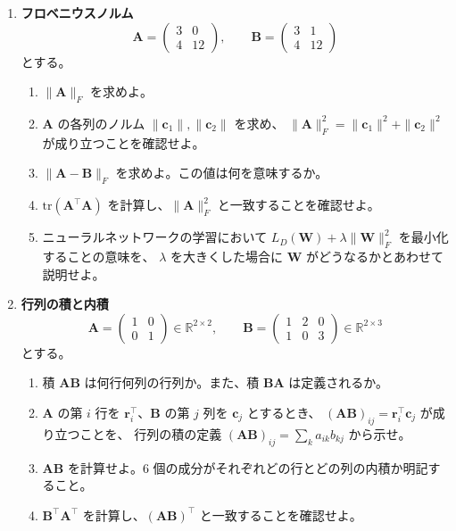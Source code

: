 \begin{enumerate}
  \item \textbf{フロベニウスノルム}\quad
    \begin{equation*}
      \bm{A} = \begin{pmatrix} 3 & 0 \\ 4 & 12 \end{pmatrix}, \qquad
      \bm{B} = \begin{pmatrix} 3 & 1 \\ 4 & 12 \end{pmatrix}
    \end{equation*}
    とする。
    \begin{enumerate}
      \item $\|\bm{A}\|_F$ を求めよ。
      \item $\bm{A}$ の各列のノルム $\|\bm{c}_1\|, \|\bm{c}_2\|$ を求め、
        $\|\bm{A}\|_F^2 = \|\bm{c}_1\|^2 + \|\bm{c}_2\|^2$ が成り立つことを確認せよ。
      \item $\|\bm{A} - \bm{B}\|_F$ を求めよ。この値は何を意味するか。
      \item $\mathrm{tr}(\bm{A}^\top \bm{A})$ を計算し、$\|\bm{A}\|_F^2$ と一致することを確認せよ。
      \item ニューラルネットワークの学習において
        $L_D(\bm{W}) + \lambda \|\bm{W}\|_F^2$ を最小化することの意味を、
        $\lambda$ を大きくした場合に $\bm{W}$ がどうなるかとあわせて説明せよ。
    \end{enumerate}

  \item \textbf{行列の積と内積}\quad
    \begin{equation*}
      \bm{A} = \begin{pmatrix} 1 & 0 \\ 0 & 1 \end{pmatrix} \in \mathbb{R}^{2 \times 2},
      \qquad
      \bm{B} = \begin{pmatrix} 1 & 2 & 0 \\ 1 & 0 & 3 \end{pmatrix} \in \mathbb{R}^{2 \times 3}
    \end{equation*}
    とする。
    \begin{enumerate}
      \item 積 $\bm{A}\bm{B}$ は何行何列の行列か。また、積 $\bm{B}\bm{A}$ は定義されるか。
      \item $\bm{A}$ の第 $i$ 行を $\bm{r}_i^\top$、$\bm{B}$ の第 $j$ 列を $\bm{c}_j$ とするとき、
        $(\bm{A}\bm{B})_{ij} = \bm{r}_i^\top \bm{c}_j$ が成り立つことを、
        行列の積の定義 $(\bm{A}\bm{B})_{ij} = \sum_{k} a_{ik} b_{kj}$ から示せ。
      \item $\bm{A}\bm{B}$ を計算せよ。$6$ 個の成分がそれぞれどの行とどの列の内積か明記すること。
      \item $\bm{B}^\top \bm{A}^\top$ を計算し、$(\bm{A}\bm{B})^\top$ と一致することを確認せよ。
    \end{enumerate}


\end{enumerate}
